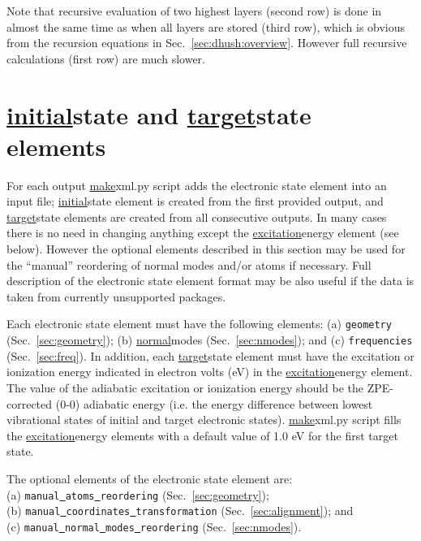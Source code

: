\documentclass[11pt]{article}
\begin{document}
Note that recursive evaluation of two highest layers (second row) is done in almost the same time 
as when all layers are stored (third row), 
which is obvious from the recursion equations in Sec.~\ref{sec:dhush:overview}.
However full recursive calculations (first row) are much slower.


\section{\ul{initial}{state} and \ul{target}{state} elements}
\label{sec:elstates}

For each \ai output \ul{make}{xml.py} script adds the electronic state element 
into an input  \xml file; \ul{initial}{state} element is created from the first provided output, 
and \ul{target}{state} elements are created from all consecutive outputs.
In many cases there is no need in changing anything except the \ul{excitation}{energy} element (see below).
However the optional elements described in this section may be used for 
the ``manual'' reordering of normal modes and/or atoms if necessary.
Full description of the electronic state element format may be also useful 
if the data is taken from currently unsupported \ai packages.

Each electronic state element must have the following elements: 
(a) {\tt geometry} (Sec.~\ref{sec:geometry});
(b) \ul{normal}{modes} (Sec.~\ref{sec:nmodes});
and (c) {\tt frequencies} (Sec.~\ref{sec:freq}). 
In addition, each \ul{target}{state} element must have the excitation or ionization energy indicated in electron 
volts (eV) in the \ul{excitation}{energy} element. The value of the adiabatic excitation or ionization energy 
should be the ZPE-corrected (0-0) adiabatic energy (i.e. the energy difference between lowest vibrational states of 
initial and target electronic states). \ul{make}{xml.py} script fills the \ul{excitation}{energy} elements with a default value
of 1.0 eV for the first target state.

The optional elements of the electronic state element are:\\
(a) {\tt manual\underline{~}atoms\underline{~}reordering} (Sec.~\ref{sec:geometry});\\
(b) {\tt manual\underline{~}coordinates\underline{~}transformation} (Sec.~\ref{sec:alignment}); and\\
(c) {\tt manual\underline{~}normal\underline{~}modes\underline{~}reordering} (Sec.~\ref{sec:nmodes}).
\end{document}
